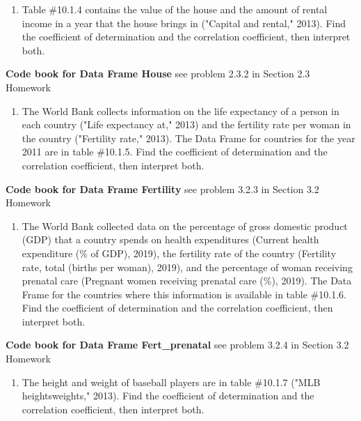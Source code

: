 \documentclass[
]{book}
\providecommand{\tightlist}{%
  \setlength{\itemsep}{0pt}\setlength{\parskip}{0pt}}
\begin{document}
\begin{enumerate}
\def\labelenumi{\arabic{enumi}.}
\setcounter{enumi}{1}
\tightlist
\item
  Table \#10.1.4 contains the value of the house and the amount of rental income in a year that the house brings in ("Capital and rental," 2013). Find the coefficient of determination and the correlation coefficient, then interpret both.
\end{enumerate}

\textbf{Code book for Data Frame House} see problem 2.3.2 in Section 2.3 Homework

\begin{enumerate}
\def\labelenumi{\arabic{enumi}.}
\setcounter{enumi}{2}
\tightlist
\item
  The World Bank collects information on the life expectancy of a person in each country ("Life expectancy at," 2013) and the fertility rate per woman in the country ("Fertility rate," 2013). The Data Frame for countries for the year 2011 are in table \#10.1.5. Find the coefficient of determination and the correlation coefficient, then interpret both.
\end{enumerate}

\textbf{Code book for Data Frame Fertility} see problem 3.2.3 in Section 3.2 Homework

\begin{enumerate}
\def\labelenumi{\arabic{enumi}.}
\setcounter{enumi}{3}
\tightlist
\item
  The World Bank collected data on the percentage of gross domestic product (GDP) that a country spends on health expenditures (Current health expenditure (\% of GDP), 2019), the fertility rate of the country (Fertility rate, total (births per woman), 2019), and the percentage of woman receiving prenatal care (Pregnant women receiving prenatal care (\%), 2019). The Data Frame for the countries where this information is available in table \#10.1.6. Find the coefficient of determination and the correlation coefficient, then interpret both.
\end{enumerate}

\textbf{Code book for Data Frame Fert\_prenatal} see problem 3.2.4 in Section 3.2 Homework

\begin{enumerate}
\def\labelenumi{\arabic{enumi}.}
\setcounter{enumi}{4}
\tightlist
\item
  The height and weight of baseball players are in table \#10.1.7 ("MLB heightsweights," 2013). Find the coefficient of determination and the correlation coefficient, then interpret both.
\end{enumerate}
\end{document}
